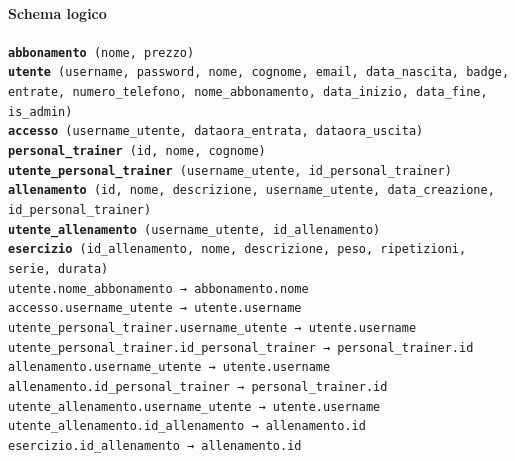 \documentclass[a4paper]{article}
\begin{document}
	\paragraph{Schema logico}
	\texttt{{\bf abbonamento} (nome, prezzo)\\
		{\bf utente} (username, password, nome, cognome, email, data\_nascita, badge, entrate, numero\_telefono, nome\_abbonamento, data\_inizio, data\_fine, is\_admin)\\
		{\bf accesso} (username\_utente, dataora\_entrata, dataora\_uscita)\\
		{\bf personal\_trainer} (id, nome, cognome)\\
		{\bf utente\_personal\_trainer} (username\_utente, id\_personal\_trainer)\\
		{\bf allenamento} (id, nome, descrizione, username\_utente, data\_creazione, id\_personal\_trainer)\\
		{\bf utente\_allenamento} (username\_utente, id\_allenamento)\\
		{\bf esercizio} (id\_allenamento, nome, descrizione, peso, ripetizioni, serie, durata)\\
		utente.nome\_abbonamento → abbonamento.nome\\
		accesso.username\_utente → utente.username\\
		utente\_personal\_trainer.username\_utente → utente.username\\
		utente\_personal\_trainer.id\_personal\_trainer → personal\_trainer.id\\
		allenamento.username\_utente → utente.username\\
		allenamento.id\_personal\_trainer → personal\_trainer.id\\
		utente\_allenamento.username\_utente → utente.username\\
		utente\_allenamento.id\_allenamento → allenamento.id\\
		esercizio.id\_allenamento → allenamento.id
}
\end{document}
